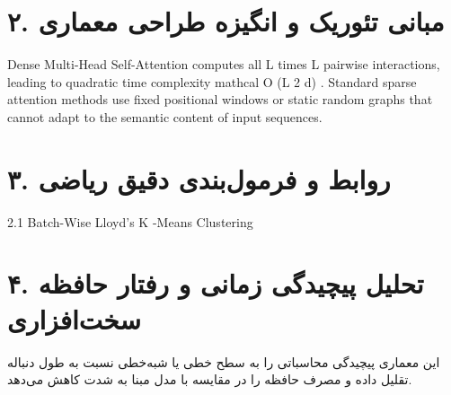 \documentclass[12pt,a4paper]{article}
\begin{document}
\section*{۲. مبانی تئوریک و انگیزه طراحی معماری}
Dense Multi-Head Self-Attention computes all L times L pairwise interactions, leading to quadratic time complexity mathcal O (L 2 d) . Standard sparse attention methods use fixed positional windows or static random graphs that cannot adapt to the semantic content of input sequences.

\section*{۳. روابط و فرمول‌بندی دقیق ریاضی}
2.1 Batch-Wise Lloyd's K -Means Clustering

\section*{۴. تحلیل پیچیدگی زمانی و رفتار حافظه سخت‌افزاری}
این معماری پیچیدگی محاسباتی را به سطح خطی یا شبه‌خطی نسبت به طول دنباله تقلیل داده و مصرف حافظه را در مقایسه با مدل مبنا به شدت کاهش می‌دهد.
\end{document}
